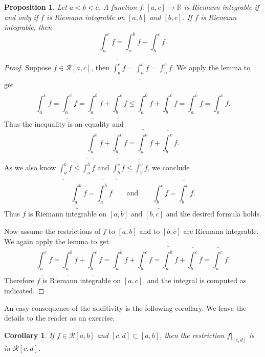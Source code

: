 \documentclass[12pt]{book}
\newcommand{\R}{{\mathbb{R}}}
\newcommand{\sR}{{\mathcal{R}}}
\theoremstyle{plain}
\newtheorem{prop}[thm]{Proposition}
\newtheorem{cor}[thm]{Corollary}
\theoremstyle{remark}
\theoremstyle{definition}
\theoremstyle{exercise}
\theoremstyle{example}
\begin{document}
\begin{prop}
Let $a < b < c$.  A function $f \colon [a,c] \to \R$ is Riemann integrable
if and only if $f$ is Riemann integrable on $[a,b]$ and $[b,c]$.  If
$f$ is Riemann integrable, then
\begin{equation*}
\int_a^c f
=
\int_a^b f
+
\int_b^c f .
\end{equation*}
\end{prop}

\begin{proof}
Suppose $f \in \sR[a,c]$, then 
$\overline{\int_a^c} f = 
\underline{\int_a^c} f = 
\int_a^c f$.  We apply the lemma to get
\begin{equation*}
\int_a^c f
=
\underline{\int_a^c} f
 =
\underline{\int_a^b} f + \underline{\int_b^c} f
 \leq
\overline{\int_a^b} f + \overline{\int_b^c} f
 =
\overline{\int_a^c} f
 =
\int_a^c f .
\end{equation*}
Thus the inequality is an equality and
\begin{equation*}
\underline{\int_a^b} f + \underline{\int_b^c} f
=
\overline{\int_a^b} f + \overline{\int_b^c} f .
\end{equation*}
As we also know 
$\underline{\int_a^b} f \leq \overline{\int_a^b} f$
and
$\underline{\int_b^c} f \leq \overline{\int_b^c} f$, we 
conclude 
\begin{equation*}
\underline{\int_a^b} f
=
\overline{\int_a^b} f
\qquad \text{and} \qquad
\underline{\int_b^c} f
=
\overline{\int_b^c} f .
\end{equation*}
Thus $f$ is Riemann integrable on $[a,b]$ and $[b,c]$ and the desired formula
holds.

Now assume the restrictions of $f$ to $[a,b]$ and to $[b,c]$
are Riemann integrable.  We again apply the lemma to get
\begin{equation*}
\underline{\int_a^c} f
=
\underline{\int_a^b} f + \underline{\int_b^c} f
=
\int_a^b f + \int_b^c f
=
\overline{\int_a^b} f + \overline{\int_b^c} f
=
\overline{\int_a^c} f .
\end{equation*}
Therefore $f$ is Riemann integrable on $[a,c]$, and the integral is computed
as indicated.
\end{proof}

An easy consequence of the additivity is the following corollary.  We
leave the details to the reader as an exercise.

\begin{cor} \label{intsubcor}
If $f \in \sR[a,b]$ and
$[c,d] \subset [a,b]$, then
the restriction $f|_{[c,d]}$ is in $\sR[c,d]$.
\end{cor}
\end{document}
